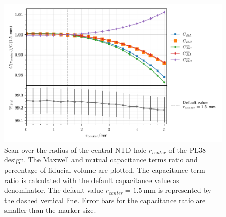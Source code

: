 \begin{figure}
\centering
\includegraphics[scale=1]{Figures/ElectrodesScan/capacitance_fiducial_r_center_pl38.pdf}
\caption{Scan over the radius of the central NTD hole $r_{center}$ of the PL38 design. The Maxwell and mutual capacitance terms ratio and percentage of fiducial volume are plotted. The capacitance term ratio is calculated with the default capacitance value as denominator. The default value $r_{center}=\SI{1.5}{\mm}$ is represented by the dashed vertical line. Error bars for the capacitance ratio are smaller than the marker size.}
\label{fig:capacitance-fiducial-r-center-pl38}
\end{figure}

